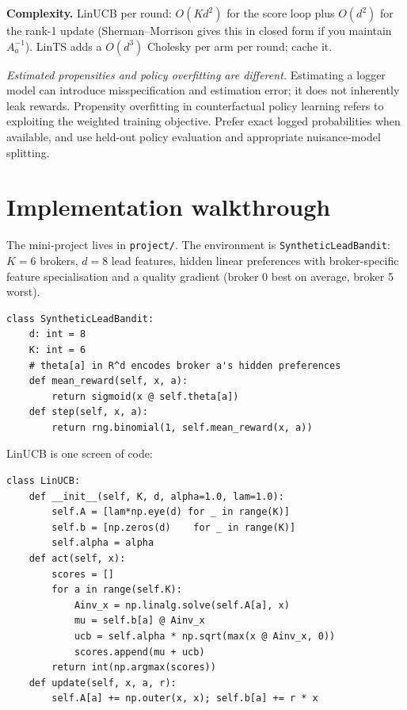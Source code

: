 \documentclass[11pt,oneside]{scrbook}
\begin{document}
\textbf{Complexity.} LinUCB per round: $O(K d^2)$ for the score loop plus
$O(d^2)$ for the rank-1 update (Sherman--Morrison gives this in closed form
if you maintain $A_a^{-1}$). LinTS adds a $O(d^3)$ Cholesky per arm per
round; cache it.

\begin{pitfall}
\emph{Estimated propensities and policy overfitting are different.}
Estimating a logger model can introduce misspecification and estimation
error; it does not inherently leak rewards. Propensity overfitting in
counterfactual policy learning refers to exploiting the weighted training
objective. Prefer exact logged probabilities when available, and use
held-out policy evaluation and appropriate nuisance-model splitting.

\end{pitfall}

\chapter{Implementation walkthrough}

The mini-project lives in \texttt{project/}. The environment is
\texttt{SyntheticLeadBandit}: $K=6$ brokers, $d=8$ lead features, hidden linear
preferences with broker-specific feature specialisation and a quality
gradient (broker 0 best on average, broker 5 worst).

\begin{verbatim}
class SyntheticLeadBandit:
    d: int = 8
    K: int = 6
    # theta[a] in R^d encodes broker a's hidden preferences
    def mean_reward(self, x, a):
        return sigmoid(x @ self.theta[a])
    def step(self, x, a):
        return rng.binomial(1, self.mean_reward(x, a))
\end{verbatim}

LinUCB is one screen of code:

\begin{verbatim}
class LinUCB:
    def __init__(self, K, d, alpha=1.0, lam=1.0):
        self.A = [lam*np.eye(d) for _ in range(K)]
        self.b = [np.zeros(d)    for _ in range(K)]
        self.alpha = alpha
    def act(self, x):
        scores = []
        for a in range(self.K):
            Ainv_x = np.linalg.solve(self.A[a], x)
            mu = self.b[a] @ Ainv_x
            ucb = self.alpha * np.sqrt(max(x @ Ainv_x, 0))
            scores.append(mu + ucb)
        return int(np.argmax(scores))
    def update(self, x, a, r):
        self.A[a] += np.outer(x, x); self.b[a] += r * x
\end{verbatim}
\end{document}
